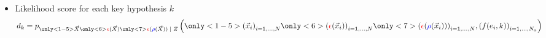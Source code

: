 \begin{frame}
\begin{itemize}
\item Likelihood score for each key hypothesis $k$
\begin{equation*}
d_k =  \pdf_{\given{\only<1-5>{\vaLeakVec}\only<6>{\textcolor{red}{\extract}(\vaLeakVec)}\only<7>{\textcolor{red}{\extract}(\textcolor{blue}{\rho}(\vaLeakVec))}}{\sensRandVar}}\left(\only<1-5>{\left(\vLeakVec_i\right)_{i=1,\dots,N}}\only<6>{\left(\textcolor{red}{\extract}(\vLeakVec_i)\right)_{i=1,\dots,N}}\only<7>{\left(\textcolor{red}{\extract}(\textcolor{blue}{\rho}(\vLeakVec_i))\right)_{i=1,\dots,N}}, \left(\sensFunction(\publicParVar_i,\keyVar)\right)_{i=1,\dots,N_a}\right)
\end{equation*}
%
\end{itemize}

\end{frame}


